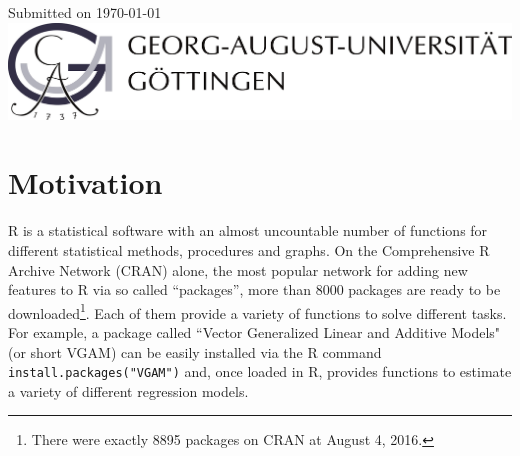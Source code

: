 \documentclass[12pt]{article} %
\newcommand{\li}{\lstinline}
\begin{document}
\begin{titlepage}

{\large Submitted on \today}\\[3.2cm] %


\includegraphics{figures/logo}\\[1cm]
 

\vfill %
\end{titlepage}
\restoregeometry
\clearpage

\tableofcontents


\listoffigures

\listoftables

\clearpage


\section{Motivation}

R is a statistical software with an almost uncountable number of functions for different statistical methods, procedures and graphs. On the Comprehensive R Archive Network (CRAN) alone, the most popular network for adding new features to R via so called ``packages'', more than 8000 packages are ready to be downloaded\footnote{There were exactly 8895 packages on CRAN at August 4, 2016.}. Each of them provide a variety of functions to solve different tasks. For example, a package called ``Vector Generalized Linear and Additive Models" (or short VGAM) can be easily installed via the R command \li{install.packages("VGAM")} and, once loaded in R, provides functions to estimate a variety of different regression models.
\end{document}
